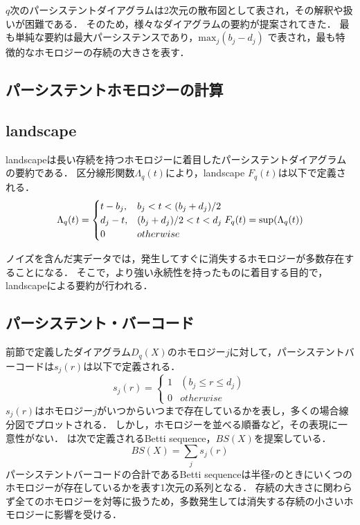 \documentclass{jarticle}
\begin{document}
$q$次のパーシステントダイアグラムは2次元の散布図として表され，その解釈や扱いが困難である．
そのため，様々なダイアグラムの要約が提案されてきた．
最も単純な要約は最大パーシステンスであり，$\text{max}_j(b_j - d_j)$
で表され，最も特徴的なホモロジーの存続の大きさを表す．

\subsection{パーシステントホモロジーの計算}

\subsection{landscape}
landscape\cite{Bubenik2015}は長い存続を持つホモロジーに着目したパーシステントダイアグラムの要約である．
区分線形関数$\Lambda_q(t)$により，landscape $F_q(t)$は以下で定義される．
$$
\Lambda_q(t) = 
\begin{cases}
  t-b_j, & b_j < t < (b_j+d_j)/2 \\
  d_j-t, & (b_j+d_j)/2< t < d_j\\
  0 & otherwise
\end{cases}
\\
F_q(t) = \text{sup}(\Lambda_q(t))
$$

ノイズを含んだ実データでは，発生してすぐに消失するホモロジーが多数存在することになる．
そこで，より強い永続性を持ったものに着目する目的で，landscapeによる要約が行われる．


\subsection{パーシステント・バーコード}
前節で定義したダイアグラム$D_q(X)$のホモロジー$j$に対して，パーシステントバーコードは$s_j(r)$は以下で定義される．
$$
s_j(r) = 
\begin{cases}
1 & (b_j \leq r \leq d_j)\\
0 & otherwise
\end{cases}
$$
$s_j(r)$はホモロジー$j$がいつからいつまで存在しているかを表し，多くの場合線分図でプロットされる．
しかし，ホモロジーを並べる順番など，その表現に一意性がない．
\cite{Umeda2017}は次で定義されるBetti sequence，$BS(X)$を提案している．
$$
BS(X) = \sum_j s_j(r)
$$
パーシステントバーコードの合計であるBetti sequenceは半径$r$のときにいくつのホモロジーが存在しているかを表す1次元の系列となる．
存続の大きさに関わらず全てのホモロジーを対等に扱うため，多数発生しては消失する存続の小さいホモロジーに影響を受ける．
\end{document}
